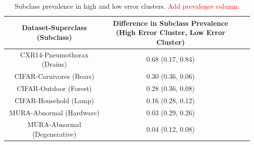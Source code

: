 \documentclass{article}
\begin{document}
 \begin{table}[]
 \centering
\begin{tabular}{|c|c|c|c|}
\hline
 Dataset-Superclass (Subclass) & \makecell{Difference in Subclass Prevalence \\ (High Error Cluster, Low Error Cluster)} \\
 \hline
 CXR14-Pneumothorax (Drains) & 0.68 (0.17, 0.84) \\
 CIFAR-Carnivores (Bears) & 0.30 (0.36, 0.06) \\
 CIFAR-Outdoor (Forest) & 0.28 (0.36, 0.08) \\
 CIFAR-Household (Lamp) & 0.16 (0.28, 0.12) \\
 MURA-Abnormal (Hardware) & 0.03 (0.29, 0.26) \\
 MURA-Abnormal (Degenerative) & 0.04 (0.12, 0.08) \\
 \hline
\end{tabular}
\caption{ Subclass prevalence in high and low error clusters. \textcolor{red}{Add prevalence column.}}
\label{tab:clustercifar-1}
\vspace{- 8 mm}
\end{table}


%
\end{document}
